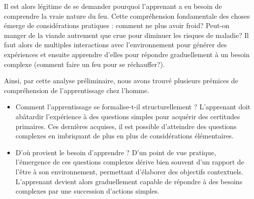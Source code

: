 Il est alors légitime de se demander pourquoi l'apprenant a eu besoin de comprendre la vraie nature du feu. Cette  compréhension fondamentale des choses émerge de considérations pratiques : comment ne plus avoir froid? Peut-on manger de la viande autrement que crue pour diminuer les risques de maladie? Il faut alors de multiples interactions avec l'environnement pour générer des expériences et ensuite apprendre d'elles pour répondre graduellement à un besoin complexe (comment faire un feu pour se réchauffer?).
    
Ainsi, par cette analyse préliminaire, nous avons trouvé plusieurs prémices de compréhension de l'apprentissage chez l'homme.
    \begin{itemize}
        \item Comment l'apprentissage se formalise-t-il structurellement ?
        L'apprenant doit abâtardir l'expérience à des questions simples pour acquérir des certitudes primaires. Ces dernières acquises, il est possible d'atteindre des questions complexes en imbriquant de plus en plus de considérations élémentaires. 
        \item D'où provient le besoin d'apprendre ? D'un point de vue pratique, l'émergence de ces questions complexes dérive bien souvent d'un rapport de l'être à son environnement, permettant d'élaborer des objectifs contextuels. L'apprenant devient alors graduellement capable de répondre à des besoins complexes par une succession d'actions simples.
    \end{itemize}

